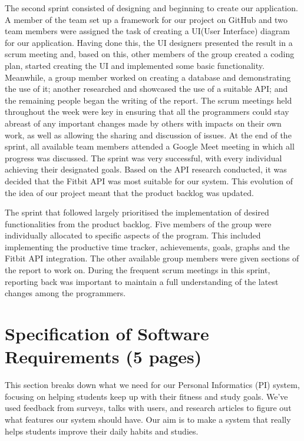 \documentclass[12pt]{article}
\begin{document}
The second sprint consisted of designing and beginning to create our application. A member of the team set up a framework for our project on GitHub and two team members were assigned the task of creating a UI(User Interface) diagram for our application. Having done this, the UI designers presented the result in a scrum meeting and, based on this, other members of the group created a coding plan, started creating the UI and implemented some basic functionality. Meanwhile, a group member worked on creating a database and demonstrating the use of it; another researched and showcased the use of a suitable API; and the remaining people began the writing of the report. The scrum meetings held throughout the week were key in ensuring that all the programmers could stay abreast of any important changes made by others with impacts on their own work, as well as allowing the sharing and discussion of issues. At the end of the sprint, all available team members attended a Google Meet meeting in which all progress was discussed. The sprint was very successful, with every individual achieving their designated goals. Based on the API research conducted, it was decided that the Fitbit API was most suitable for our system. This evolution of the idea of our project meant that the product backlog was updated.\par

The sprint that followed largely prioritised the implementation of desired functionalities from the product backlog. Five members of the group were individually allocated to specific aspects of the program. This included implementing the productive time tracker, achievements, goals, graphs and the Fitbit API integration. The other available group members were given sections of the report to work on. During the frequent scrum meetings in this sprint, reporting back was important to maintain a full understanding of the latest changes among the programmers.


\section{Specification of Software Requirements (5 pages)}

This section breaks down what we need for our Personal Informatics (PI) system, 
focusing on helping students keep up with their fitness and study goals. 
We've used feedback from surveys, talks with users, and research articles to 
figure out what features our system should have. Our aim is to make a system 
that really helps students improve their daily habits and studies.\par
\end{document}
